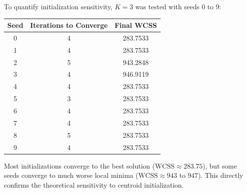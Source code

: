To quantify initialization sensitivity, \(K=3\) was tested with seeds \(0\) to \(9\):
\begin{center}
\begin{tabular}{ccc}
\toprule
Seed & Iterations to Converge & Final WCSS \\
\midrule
0 & 4 & 283.7533 \\
1 & 4 & 283.7533 \\
2 & 5 & 943.2848 \\
3 & 4 & 946.9119 \\
4 & 4 & 283.7533 \\
5 & 3 & 283.7533 \\
6 & 4 & 283.7533 \\
7 & 4 & 283.7533 \\
8 & 5 & 283.7533 \\
9 & 4 & 283.7533 \\
\bottomrule
\end{tabular}
\end{center}

Most initializations converge to the best solution (\(\text{WCSS}\approx 283.75\)), but some seeds converge to much worse local minima (\(\text{WCSS}\approx 943\) to \(947\)). This directly confirms the theoretical sensitivity to centroid initialization.
